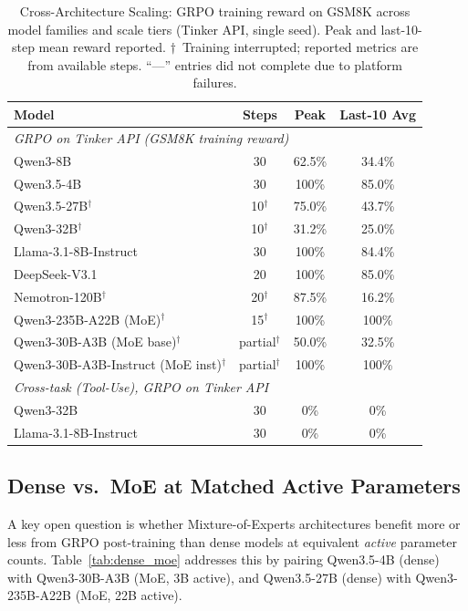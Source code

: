 \documentclass{article}
\begin{document}
\begin{table}[htbp]
\centering
\caption{Cross-Architecture Scaling: GRPO training reward on GSM8K across model families
and scale tiers (Tinker API, single seed). Peak and last-10-step mean reward reported.
$\dagger$~Training interrupted; reported metrics are from available steps.
``---'' entries did not complete due to platform failures.}
\label{tab:cross_arch_scaling}
\begin{tabular}{lccc}
\toprule
\textbf{Model} & \textbf{Steps} & \textbf{Peak} & \textbf{Last-10 Avg} \\
\midrule
\multicolumn{4}{l}{\textit{GRPO on Tinker API (GSM8K training reward)}} \\
\midrule
Qwen3-8B & 30 & 62.5\% & 34.4\% \\
Qwen3.5-4B & 30 & 100\% & 85.0\% \\
Qwen3.5-27B$^\dagger$ & 10$^\dagger$ & 75.0\% & 43.7\% \\
Qwen3-32B$^\dagger$ & 10$^\dagger$ & 31.2\% & 25.0\% \\
Llama-3.1-8B-Instruct & 30 & 100\% & 84.4\% \\
DeepSeek-V3.1 & 20 & 100\% & 85.0\% \\
Nemotron-120B$^\dagger$ & 20$^\dagger$ & 87.5\% & 16.2\% \\
Qwen3-235B-A22B (MoE)$^\dagger$ & 15$^\dagger$ & 100\% & 100\% \\
Qwen3-30B-A3B (MoE base)$^\dagger$ & partial$^\dagger$ & 50.0\% & 32.5\% \\
Qwen3-30B-A3B-Instruct (MoE inst)$^\dagger$ & partial$^\dagger$ & 100\% & 100\% \\
\midrule
\multicolumn{4}{l}{\textit{Cross-task (Tool-Use), GRPO on Tinker API}} \\
\midrule
Qwen3-32B & 30 & 0\% & 0\% \\
Llama-3.1-8B-Instruct & 30 & 0\% & 0\% \\
\bottomrule
\end{tabular}
\end{table}


\subsection{Dense vs.~MoE at Matched Active Parameters}
\label{sec:dense_moe}

A key open question is whether Mixture-of-Experts architectures benefit
more or less from GRPO post-training than dense models at equivalent
\emph{active} parameter counts. Table~\ref{tab:dense_moe} addresses this
by pairing Qwen3.5-4B (dense) with Qwen3-30B-A3B (MoE, 3B active),
and Qwen3.5-27B (dense) with Qwen3-235B-A22B (MoE, 22B active).
\end{document}

